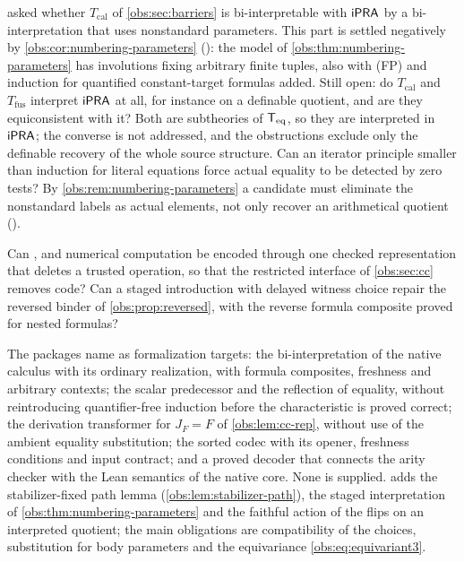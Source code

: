 \begin{question}
 asked whether $T_{\mathrm{cal}}$ of
\cref{obs:sec:barriers} is bi-interpretable with $\mathsf{iPRA}$ by a
bi-interpretation that uses nonstandard parameters. This part is settled
negatively by \cref{obs:cor:numbering-parameters} ():
the model of \cref{obs:thm:numbering-parameters} has involutions fixing
arbitrary finite tuples, also with (FP) and induction for quantified
constant-target formulas added. Still open: do $T_{\mathrm{cal}}$ and
$T_{\mathrm{fus}}$ interpret $\mathsf{iPRA}$ at all, for instance on a definable
quotient, and are they equiconsistent with it? Both are subtheories of $\mathsf{T}_{\mathrm{eq}}$,
so they are interpreted in $\mathsf{iPRA}$; the converse is not addressed, and the
obstructions exclude only the definable recovery of the whole source
structure. Can an iterator principle smaller than induction for literal
equations force actual equality to be detected by zero tests? By
\cref{obs:rem:numbering-parameters} a candidate must eliminate the nonstandard
labels as actual elements, not only recover an arithmetical quotient
().
\end{question}

\begin{question}
Can ,  and numerical computation be encoded through
one checked representation that deletes a trusted operation, so that the
restricted interface of \cref{obs:sec:cc} removes code? Can a staged
introduction with delayed witness choice repair the reversed binder of
\cref{obs:prop:reversed}, with the reverse formula composite proved for nested
formulas?
\end{question}

\begin{question}[Formalization]
The packages name as formalization targets: the bi-interpretation of the native
calculus with its ordinary realization, with formula composites, freshness and
arbitrary contexts; the scalar predecessor and the reflection of equality,
without reintroducing quantifier-free induction before the characteristic is
proved correct; the derivation transformer for $J_F=F$ of
\cref{obs:lem:cc-rep}, without use of the ambient equality substitution; the
sorted codec with its opener, freshness conditions and input contract; and a
proved decoder that connects the arity checker with the Lean semantics of the
native core. None is supplied.  adds the
stabilizer-fixed path lemma (\cref{obs:lem:stabilizer-path}), the staged
interpretation of \cref{obs:thm:numbering-parameters} and the faithful action
of the flips on an interpreted quotient; the main obligations are
compatibility of the choices, substitution for body parameters and the
equivariance \eqref{obs:eq:equivariant3}.
\end{question}

